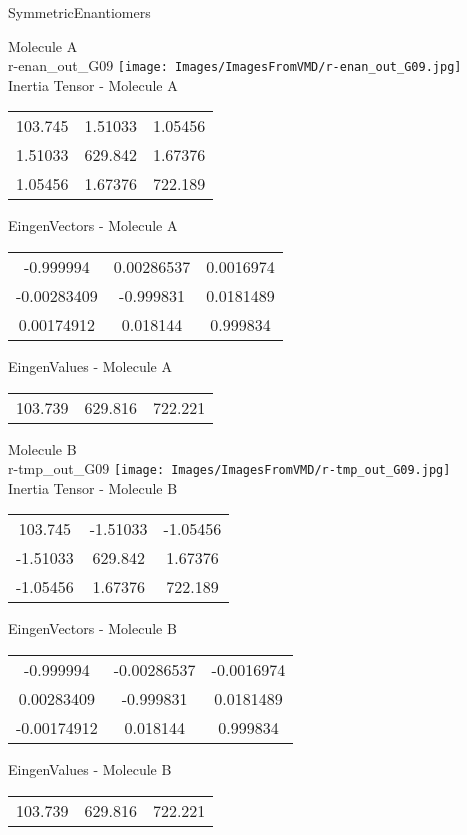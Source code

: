 \vtab[-2cm]
\begin{center}
{\large SymmetricEnantiomers}
\end{center}
\begin{multicols}{2}
\begin{center}
Molecule A \\ 
r-enan\_out\_G09
\texttt{[image: Images/ImagesFromVMD/r-enan\_out\_G09.jpg]}
\\
Inertia Tensor - Molecule A \\
\vtab
\begin{tabular}{|c c c|}
103.745	 & 	1.51033	 & 	1.05456	 \\
1.51033	 & 	629.842	 & 	1.67376	 \\
1.05456	 & 	1.67376	 & 	722.189
\end{tabular}

\vtab
 EingenVectors - Molecule A     \\
\vtab
\begin{tabular}{|c c c|}
-0.999994	 & 	0.00286537	 & 	0.0016974	 \\
-0.00283409	 & 	-0.999831	 & 	0.0181489	 \\
0.00174912	 & 	0.018144	 & 	0.999834
\end{tabular}

\vtab
 EingenValues - Molecule A     \\
\vtab
\begin{tabular}{|c c c|}
103.739	 & 	629.816	 & 	722.221
\end{tabular}
\columnbreak

Molecule B \\ 
r-tmp\_out\_G09
\texttt{[image: Images/ImagesFromVMD/r-tmp\_out\_G09.jpg]}
\\
Inertia Tensor - Molecule B \\
\vtab
\begin{tabular}{|c c c|}
103.745	 & 	-1.51033	 & 	-1.05456	 \\
-1.51033	 & 	629.842	 & 	1.67376	 \\
-1.05456	 & 	1.67376	 & 	722.189
\end{tabular}

\vtab
 EingenVectors - Molecule B     \\
\vtab
\begin{tabular}{|c c c|}
-0.999994	 & 	-0.00286537	 & 	-0.0016974	 \\
0.00283409	 & 	-0.999831	 & 	0.0181489	 \\
-0.00174912	 & 	0.018144	 & 	0.999834
\end{tabular}

\vtab
 EingenValues - Molecule B     \\
\vtab
\begin{tabular}{|c c c|}
103.739	 & 	629.816	 & 	722.221
\end{tabular}

\end{center}
\end{multicols}
